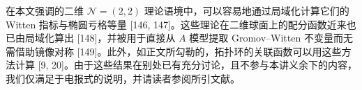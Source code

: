 在本文强调的二维 $\mathcal{N}=(2,2)$ 理论语境中，可以容易地通过局域化计算它们的 Witten 指标与椭圆亏格等量 [146, 147]。这些理论在二维球面上的配分函数近来也已由局域化算出 [148]，并被用于直接从 $A$ 模型提取 Gromov--Witten 不变量而无需借助镜像对称 [149]。此外，如正文所勾勒的，拓扑环的关联函数可以用这些方法计算 [9, 20]。由于这些结果在别处已有充分讨论，且不参与本讲义余下的内容，我们仅满足于电报式的说明，并请读者参阅所引文献。

